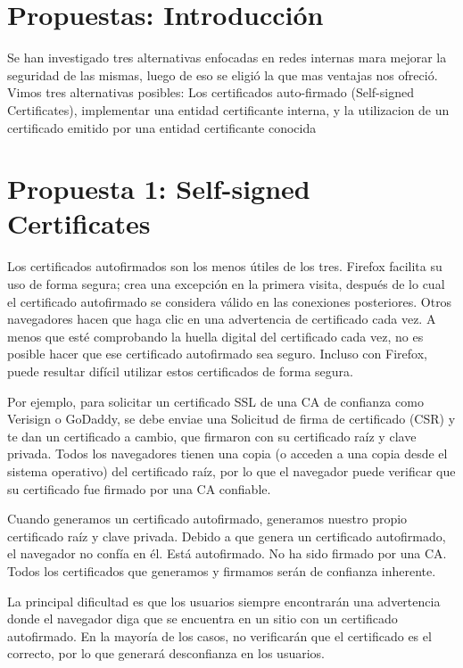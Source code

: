 
\section{Propuestas: Introducción}

Se han investigado tres alternativas enfocadas en redes internas mara mejorar la seguridad de las 
mismas, luego de eso se eligió la que mas ventajas nos ofreció.
Vimos tres alternativas posibles: Los certificados auto-firmado (Self-signed Certificates), implementar
una entidad certificante interna, y la utilizacion de un certificado emitido por una entidad
certificante conocida

\section{Propuesta 1: Self-signed Certificates}
Los certificados autofirmados son los menos útiles de los tres. Firefox facilita su uso 
de forma segura; crea una excepción en la primera visita, después de lo cual el 
certificado autofirmado se considera válido en las conexiones posteriores. Otros 
navegadores hacen que haga clic en una advertencia de certificado cada vez. A menos 
que esté comprobando la huella digital del certificado cada vez, no es posible hacer 
que ese certificado autofirmado sea seguro. Incluso con Firefox, puede resultar 
difícil utilizar estos certificados de forma segura.

Por ejemplo, para solicitar un certificado SSL de una CA de confianza como Verisign o 
GoDaddy, se debe enviae una Solicitud de firma de certificado (CSR) y te dan un 
certificado a cambio, que firmaron con su certificado raíz y clave privada. Todos 
los navegadores tienen una copia (o acceden a una copia desde el sistema operativo) 
del certificado raíz, por lo que el navegador puede verificar que su certificado 
fue firmado por una CA confiable.

Cuando generamos un certificado autofirmado, generamos nuestro propio certificado 
raíz y clave privada. Debido a que genera un certificado autofirmado, el navegador 
no confía en él. Está autofirmado. No ha sido firmado por una CA. Todos los 
certificados que generamos y firmamos serán de confianza inherente.

La principal dificultad es que los usuarios siempre encontrarán una advertencia 
donde el navegador diga que se encuentra en un sitio con un certificado autofirmado. 
En la mayoría de los casos, no verificarán que el certificado es el correcto, por 
lo que generará desconfianza en los usuarios.

